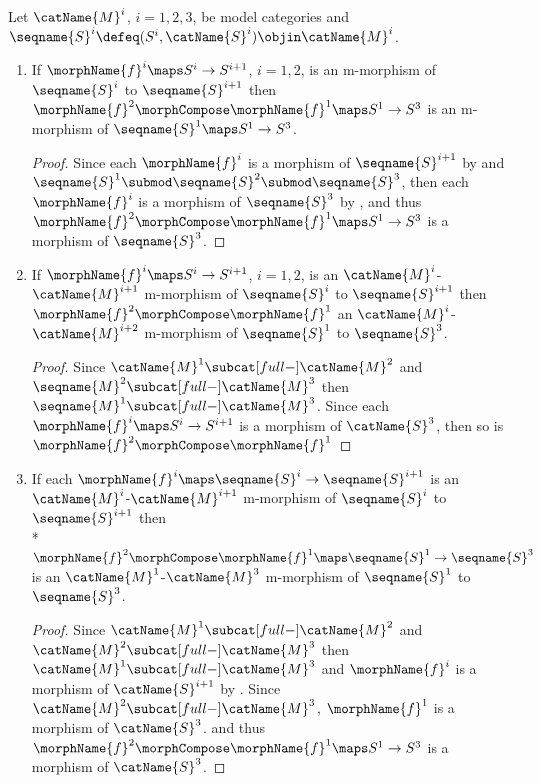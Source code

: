 \documentclass{article}
\begin{document}
\begin{lemma}
\label{lem:modMmorphcomp}
Let $\catName{M}^i$, $i=1,2,3$, be model categories and
$\seqname{S}^i \defeq (S^i, \catName{S}^i) \objin \catName{M}^i$.

\begin{enumerate}

\item
If $\morphName{f}^i \maps S^i \to S^{i+1}$, $i=1,2$, is an m-morphism of
$\seqname{S}^i$ to $\seqname{S}^{i+1}$ then
$\morphName{f}^2 \morphCompose \morphName{f}^1 \maps S^1 \to S^3$ is an
m-morphism of $\seqname{S}^1 \maps S^1 \to S^3$.

\begin{proof}
Since each $\morphName{f}^i$ is a morphism of $\seqname{S}^{i+1}$ by
 and
$\seqname{S}^1 \submod \seqname{S}^2 \submod \seqname{S}^3$, then
each $\morphName{f}^i$ is a morphism of $\seqname{S}^3$ by
, and thus
$\morphName{f}^2 \morphCompose \morphName{f}^1 \maps S^1 \to S^3$ is a morphism
of $\seqname{S}^3$.
\end{proof}

\item
If $\morphName{f}^i \maps S^i \to S^{i+1}$, $i=1,2$, is an
$\catName{M}^i$-$\catName{M}^{i+1}$ m-morphism of $\seqname{S}^i$ to
$\seqname{S}^{i+1}$ then $\morphName{f}^2 \morphCompose \morphName{f}^1$ an
$\catName{M}^i$-$\catName{M}^{i+2}$ m-morphism of $\seqname{S}^1$ to
$\seqname{S}^3$.

\begin{proof}
Since $\catName{M}^1 \subcat[full-] \catName{M}^2$ and
$\seqname{M}^2 \subcat[full-] \catName{M}^3$ then
$\seqname{M}^1 \subcat[full-] \catName{M}^3$.
Since each $\morphName{f}^i \maps S^i \to S^{i+1}$ is a morphism of
$\catName{S}^3$, then so is $\morphName{f}^2 \morphCompose \morphName{f}^1$
\end{proof}

\item
If each $\morphName{f}^i \maps \seqname{S}^i \to \seqname{S}^{i+1}$ is
an $\catName{M}^i$-$\catName{M}^{i+1}$ m-morphism of
$\seqname{S}^i$ to $\seqname{S}^{i+1}$ then \\*
\nobreaks
  {{
    $
      \morphName{f}^2 \morphCompose \morphName{f}^1 \maps
      \seqname{S}^1 \to \seqname{S}^3
    $
  }}
is an $\catName{M}^1$-$\catName{M}^3$ m-morphism of $\seqname{S}^1$ to
$\seqname{S}^3$.

\begin{proof}
Since $\catName{M}^1 \subcat[full-] \catName{M}^2$ and
$\catName{M}^2 \subcat[full-] \catName{M}^3$ then
$\catName{M}^1 \subcat[full-] \catName{M}^3$ and
$\morphName{f}^i$ is a morphism of $\catName{S}^{i+1}$ by
.
Since $\catName{M}^2 \subcat[full-] \catName{M}^3$, $\morphName{f}^1$ is a
morphism of $\catName{S}^3$. and thus
$\morphName{f}^2 \morphCompose \morphName{f}^1 \maps S^1 \to S^3$ is a morphism
of $\catName{S}^3$.
\end{proof}
\end{enumerate}
\end{lemma}
\end{document}
